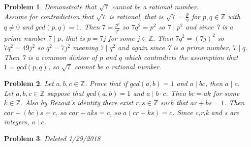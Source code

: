 \documentclass{article}
\newtheorem{Problem}{Problem}
\begin{document}
\begin{Problem}
Demonstrate that $\sqrt{7}$ cannot be a rational number. \\
Assume for contradiction that $\sqrt{7}$ is rational, that is $\sqrt{7}=\frac{p}{q}$  for $p,q\in\mathbb{Z}$ with $q\neq0$ and $gcd(p,q)=1$.  Then $7=\frac{p^2}{q^2}$ so $7q^2=p^2$ so $7\mid p^2$ and since 7 is a prime number $7\mid p$, that is $p=7j$ for some $j\in\mathbb{Z}$.  Then $7q^2=(7j)^2$ so $7q^2=49j^2$ so $q^2=7j^2$ meaning $7\mid q^2$ and again since 7 is a prime number, $7\mid q$. Then 7 is a common divisor of $p$ and $q$ which contradicts the assumption that $1=gcd(p,q)$, so $\sqrt{7}$ cannot be a rational number.
\end{Problem}
\begin{Problem}
Let $a,b,c\in\mathbb{Z}$.  Prove that if $gcd(a,b)=1$ and $a\mid bc$, then $a\mid c$. \\
Let $a,b,c\in\mathbb{Z}$ suppose that $gcd(a,b)=1$ and $a\mid b\cdot c$.  Then $bc=ak$ for some $k\in\mathbb{Z}$.  Also by Bezout's identity there exist $r,s\in\mathbb{Z}$ such that $ar+bs=1$.  Then $car+(bc)s=c$, so $car+aks=c$, so $a(cr+ks)=c$.  Since c,r,k and s are integers, $a\mid c$.
\end{Problem}
\begin{Problem}
Deleted 1/29/2018
\end{Problem}
\end{document}
